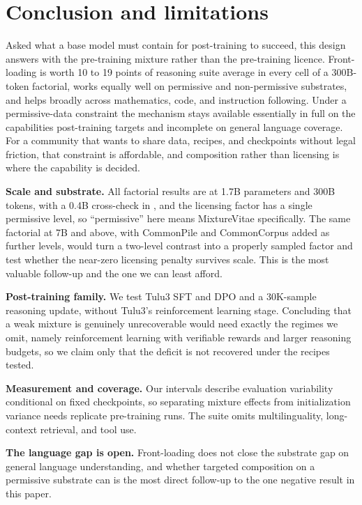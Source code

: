 \documentclass{article}
\begin{document}
\section{Conclusion and limitations}
\label{sec:limitations}

Asked what a base model must contain for post-training to succeed, this design answers with the pre-training mixture rather than the pre-training licence. Front-loading is worth 10 to 19 points of reasoning suite average in every cell of a 300B-token factorial, works equally well on permissive and non-permissive substrates, and helps broadly across mathematics, code, and instruction following. Under a permissive-data constraint the mechanism stays available essentially in full on the capabilities post-training targets and incomplete on general language coverage. For a community that wants to share data, recipes, and checkpoints without legal friction, that constraint is affordable, and composition rather than licensing is where the capability is decided.


\textbf{Scale and substrate.} All factorial results are at 1.7B parameters and 300B tokens, with a 0.4B cross-check in , and the licensing factor has a single permissive level, so ``permissive'' here means MixtureVitae specifically. The same factorial at 7B and above, with CommonPile and CommonCorpus added as further levels, would turn a two-level contrast into a properly sampled factor and test whether the near-zero licensing penalty survives scale. This is the most valuable follow-up and the one we can least afford.

\textbf{Post-training family.} We test Tulu3 SFT and DPO and a 30K-sample reasoning update, without Tulu3's reinforcement learning stage. Concluding that a weak mixture is genuinely unrecoverable would need exactly the regimes we omit, namely reinforcement learning with verifiable rewards and larger reasoning budgets, so we claim only that the deficit is not recovered under the recipes tested.

\textbf{Measurement and coverage.} Our intervals describe evaluation variability conditional on fixed checkpoints, so separating mixture effects from initialization variance needs replicate pre-training runs. The suite omits multilinguality, long-context retrieval, and tool use.

\textbf{The language gap is open.} Front-loading does not close the substrate gap on general language understanding, and whether targeted composition on a permissive substrate can is the most direct follow-up to the one negative result in this paper.
\end{document}
